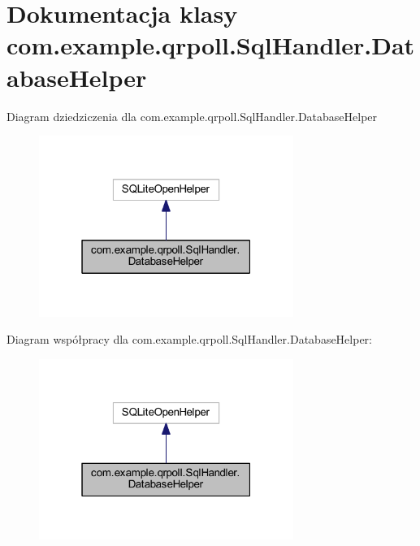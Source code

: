 \hypertarget{classcom_1_1example_1_1qrpoll_1_1_sql_handler_1_1_database_helper}{\section{Dokumentacja klasy com.\+example.\+qrpoll.\+Sql\+Handler.\+Database\+Helper}
\label{classcom_1_1example_1_1qrpoll_1_1_sql_handler_1_1_database_helper}
}


Diagram dziedziczenia dla com.\+example.\+qrpoll.\+Sql\+Handler.\+Database\+Helper
\nopagebreak
\begin{figure}[H]
\begin{center}
\leavevmode
\includegraphics[width=235pt]{classcom_1_1example_1_1qrpoll_1_1_sql_handler_1_1_database_helper__inherit__graph}
\end{center}
\end{figure}


Diagram współpracy dla com.\+example.\+qrpoll.\+Sql\+Handler.\+Database\+Helper\+:
\nopagebreak
\begin{figure}[H]
\begin{center}
\leavevmode
\includegraphics[width=235pt]{classcom_1_1example_1_1qrpoll_1_1_sql_handler_1_1_database_helper__coll__graph}
\end{center}
\end{figure}
